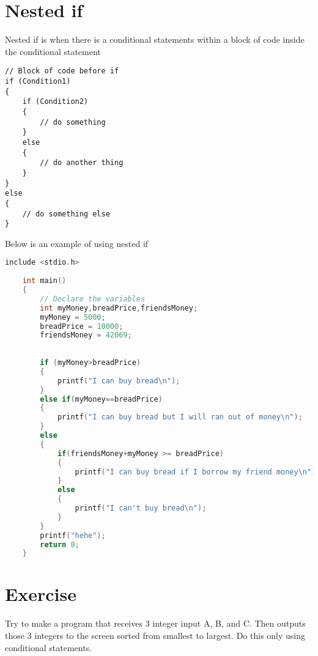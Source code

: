 \section{Nested if}
Nested if is when there is a conditional statements within a block of code inside the conditional statement
\begin{verbatim}
// Block of code before if
if (Condition1) 
{
    if (Condition2)
    {
        // do something
    }
    else
    {
        // do another thing
    }
} 
else
{
    // do something else
}
\end{verbatim}

Below is an example of using nested if

\begin{lstlisting}[language=c,caption = nested if example,label=lst:nestedifexample01]
	include <stdio.h>
	
	int main()
	{
		// Declare the variables
		int myMoney,breadPrice,friendsMoney;
		myMoney = 5000;
		breadPrice = 10000;
		friendsMoney = 42069;
		
		
		if (myMoney>breadPrice)
		{
		    printf("I can buy bread\n");
		}
		else if(myMoney==breadPrice)
		{
		    printf("I can buy bread but I will ran out of money\n");
		}
		else
		{
		    if(friendsMoney+myMoney >= breadPrice)
		    {
		        printf("I can buy bread if I borrow my friend money\n"); 
		    }
		    else
		    {
	            printf("I can't buy bread\n");	
		    }
		}
		printf("hehe");
		return 0;
	}
\end{lstlisting}


\section{Exercise}
Try to make a program that receives 3 integer input A, B, and C. Then outputs those 3 integers to the screen sorted from smallest to largest. Do this only using conditional statements.

